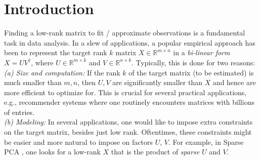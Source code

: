 \documentclass[11pt]{article}
\theoremstyle{plain}
\theoremstyle{definition}
\begin{document}
\section{Introduction}
Finding a low-rank matrix to fit / approximate observations is a fundamental task in data analysis. In a slew of applications, a popular empirical approach has been to represent the target rank $k$ matrix $X\in \mathbb{R}^{m\times n}$  in a {\em bi-linear form} $X = UV^\dag$, where $U\in \mathbb{R}^{m\times k}$ and $V\in \mathbb{R}^{n\times k}$.  Typically, this is done for two  reasons: \\
{\em (a) Size and computation:} If the rank $k$ of the target matrix (to be estimated) is much smaller than $m,n$, then  $U,V$ are significantly smaller than  $X$ and hence are more efficient to optimize for. This is crucial for several practical applications, e.g., recommender systems where one routinely encounters matrices with billions of entries. \\%
{\em (b) Modeling:} In several applications, one would like to impose extra constraints on the target matrix, besides just low rank. Oftentimes, these constraints might be easier and more natural to impose on factors $U$, $V$.  For example, in Sparse PCA \cite{ZouHT06}, one looks for a low-rank $X$ that is the product of {\em sparse} $U$ and $V$. %
\end{document}
